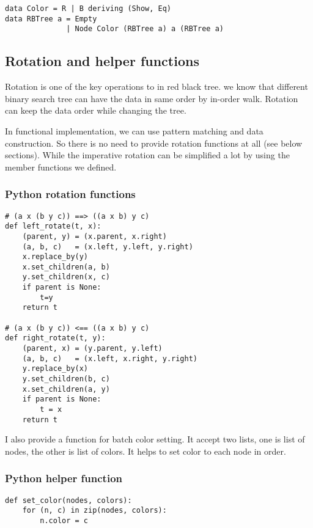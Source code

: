 \documentclass{article}
\begin{document}
\lstset{language=haskell}
\begin{lstlisting}
data Color = R | B deriving (Show, Eq) 
data RBTree a = Empty
              | Node Color (RBTree a) a (RBTree a)
\end{lstlisting}

\subsection{Rotation and helper functions} \label{helper-fun}

Rotation is one of the key operations to in red black tree. we know that
different binary search tree can have the data in same order by in-order walk.
Rotation can keep the data order while changing the tree. 

In functional implementation, we can use pattern matching and data construction.
So there is no need to provide rotation functions at all (see below sections).
While the imperative rotation can be simplified a lot by using the member functions we defined.

\subsubsection*{Python rotation functions}
\lstset{language=Python}
\begin{lstlisting}
# (a x (b y c)) ==> ((a x b) y c)
def left_rotate(t, x):
    (parent, y) = (x.parent, x.right)
    (a, b, c)   = (x.left, y.left, y.right)
    x.replace_by(y)
    x.set_children(a, b)
    y.set_children(x, c)
    if parent is None:
        t=y
    return t

# (a x (b y c)) <== ((a x b) y c)
def right_rotate(t, y):
    (parent, x) = (y.parent, y.left)
    (a, b, c)   = (x.left, x.right, y.right)
    y.replace_by(x)
    y.set_children(b, c)
    x.set_children(a, y)
    if parent is None:
        t = x
    return t
\end{lstlisting}

I also provide a function for batch color setting. It accept two lists,
one is list of nodes, the other is list of colors. It helps to set color
to each node in order.

\subsubsection*{Python helper function}
\lstset{language=Python}
\begin{lstlisting}
def set_color(nodes, colors):
    for (n, c) in zip(nodes, colors):
        n.color = c
\end{lstlisting}
\end{document}
